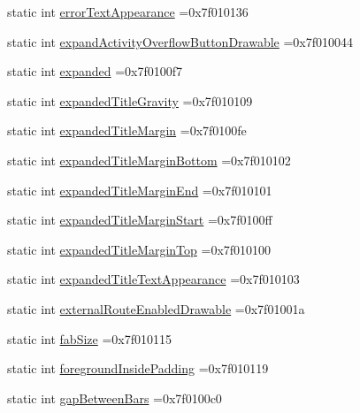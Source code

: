 \begin{DoxyCompactItemize}
static int \hyperlink{classandroid_1_1support_1_1design_1_1R_1_1attr_a605392532b4693396b9e2760d4cb8368}{error\+Text\+Appearance} =0x7f010136
\item 
static int \hyperlink{classandroid_1_1support_1_1design_1_1R_1_1attr_a61a0824e68ce23d2cb1bea33aeaf44f7}{expand\+Activity\+Overflow\+Button\+Drawable} =0x7f010044
\item 
static int \hyperlink{classandroid_1_1support_1_1design_1_1R_1_1attr_a3f3c11279bf1f89eabce9386b4cc52e7}{expanded} =0x7f0100f7
\item 
static int \hyperlink{classandroid_1_1support_1_1design_1_1R_1_1attr_a8d74b901cc208373f39160eb9126e754}{expanded\+Title\+Gravity} =0x7f010109
\item 
static int \hyperlink{classandroid_1_1support_1_1design_1_1R_1_1attr_a0fccc0bfb61b2986719bdae726085c6c}{expanded\+Title\+Margin} =0x7f0100fe
\item 
static int \hyperlink{classandroid_1_1support_1_1design_1_1R_1_1attr_a82d8696e9d3143d7e7a033ac65f01c38}{expanded\+Title\+Margin\+Bottom} =0x7f010102
\item 
static int \hyperlink{classandroid_1_1support_1_1design_1_1R_1_1attr_a27a3f75e044a26272b31b518082425c5}{expanded\+Title\+Margin\+End} =0x7f010101
\item 
static int \hyperlink{classandroid_1_1support_1_1design_1_1R_1_1attr_a2706209f152d7a23ca581cf160c8614b}{expanded\+Title\+Margin\+Start} =0x7f0100ff
\item 
static int \hyperlink{classandroid_1_1support_1_1design_1_1R_1_1attr_a2a060c1031bda301907e94df7c9ac9a9}{expanded\+Title\+Margin\+Top} =0x7f010100
\item 
static int \hyperlink{classandroid_1_1support_1_1design_1_1R_1_1attr_a76fae0174c646f6356295d5fa987cf07}{expanded\+Title\+Text\+Appearance} =0x7f010103
\item 
static int \hyperlink{classandroid_1_1support_1_1design_1_1R_1_1attr_ab10411e3c39861612dd04971d76f133f}{external\+Route\+Enabled\+Drawable} =0x7f01001a
\item 
static int \hyperlink{classandroid_1_1support_1_1design_1_1R_1_1attr_a205255b0f0a29d2da84c1e91a3acf86b}{fab\+Size} =0x7f010115
\item 
static int \hyperlink{classandroid_1_1support_1_1design_1_1R_1_1attr_afbf955c1dce92071aaf0b595e0083cb5}{foreground\+Inside\+Padding} =0x7f010119
\item 
static int \hyperlink{classandroid_1_1support_1_1design_1_1R_1_1attr_adbe39ebf03ed680b511ec8d065fa19cb}{gap\+Between\+Bars} =0x7f0100c0

\end{DoxyCompactItemize}
